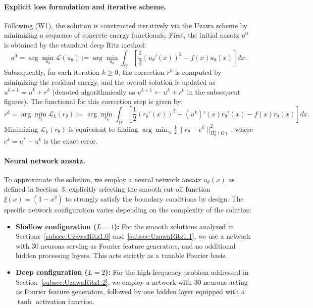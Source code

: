 \documentclass{article}
\theoremstyle{definition}
\begin{document}
\paragraph{Explicit loss formulation and iterative scheme.}
Following (W1), the solution is constructed iteratively via the Uzawa scheme by minimizing a sequence of concrete energy functionals. First, the initial ansatz $u^0$ is obtained by the standard deep Ritz method:
\begin{equation}
    u^0 = \arg \min_{u_\theta} \mathcal{L}(u_\theta) := \arg \min_{u_\theta} \int_\Omega \left[ \frac{1}{2} (u_\theta'(x))^2 - f(x)u_\theta(x) \right] dx.
\end{equation}
Subsequently, for each iteration $k \ge 0$, the correction $r^k$ is computed by minimizing the residual energy, and the overall solution is updated as $u^{k+1} = u^k + r^k$ (denoted algorithmically as $u^{k+1} \leftarrow u^k + r^k$ in the subsequent figures). The functional for this correction step is given by:
\begin{equation}
    r^{k} = \arg \min_{r_\theta} \mathcal{L}_k(r_\theta) := \arg \min_{r_\theta} \int_\Omega \left[ \frac{1}{2} (r_\theta'(x))^2 + (u^k)'(x)r_\theta'(x) - f(x)r_\theta(x) \right] dx.
\end{equation}
Minimizing $\mathcal{L}_k(r_\theta)$ is equivalent to finding $\arg\min_{r_\theta} \tfrac12\| r_\theta - e^k \|_{H^1_0(\Omega)}^2$, where $e^k = u^* - u^k$ is the exact error.

\paragraph{Neural network ansatz.}
To approximate the solution, we employ a neural network ansatz $u_\theta(x)$ as defined in Section~3, explicitly selecting the smooth cut-off function $\xi(x) = (1-x^2)$ to strongly satisfy the boundary conditions by design. The specific network configuration varies depending on the complexity of the solution:
\begin{itemize}
    \item \textbf{Shallow configuration ($L=1$):} For the smooth solutions analyzed in Sections~\ref{subsec:UzawaRitz1.0} and~\ref{subsec:UzawaRitz1.1}, we use a network with $30$ neurons serving as Fourier feature generators, and no additional hidden processing layers. This acts strictly as a tunable Fourier basis.
    \item \textbf{Deep configuration ($L=2$):} For the high-frequency problem addressed in Section~\ref{subsec:UzawaRitz1.2}, we employ a network with $30$ neurons acting as Fourier feature generators, followed by one hidden layer equipped with a $\tanh$ activation function.
\end{itemize}
\end{document}
